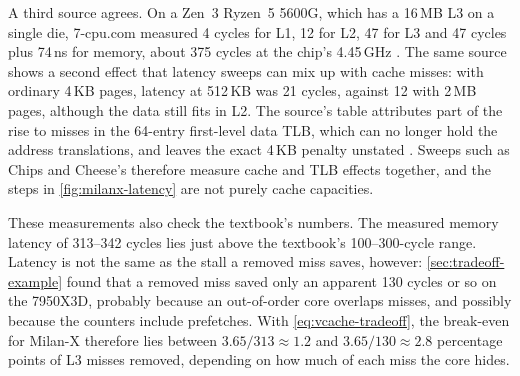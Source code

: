 A third source agrees. On a Zen~3 Ryzen~5 5600G, which has a 16\,MB L3 on a single die, 7-cpu.com measured 4 cycles for L1, 12 for L2, 47 for L3 and 47 cycles plus 74\,ns for memory, about 375 cycles at the chip's 4.45\,GHz \cite{7-cpu.comAMDZen3}. The same source shows a second effect that latency sweeps can mix up with cache misses: with ordinary 4\,KB pages, latency at 512\,KB was 21 cycles, against 12 with 2\,MB pages, although the data still fits in L2. The source's table attributes part of the rise to misses in the 64-entry first-level data TLB, which can no longer hold the address translations, and leaves the exact 4\,KB penalty unstated \cite{7-cpu.comAMDZen3}. Sweeps such as Chips and Cheese's therefore measure cache and TLB effects together, and the steps in \cref{fig:milanx-latency} are not purely cache capacities.

These measurements also check the textbook's numbers. The measured memory latency of 313--342 cycles lies just above the textbook's 100--300-cycle range. Latency is not the same as the stall a removed miss saves, however: \cref{sec:tradeoff-example} found that a removed miss saved only an apparent 130 cycles or so on the 7950X3D, probably because an out-of-order core overlaps misses, and possibly because the counters include prefetches. With \cref{eq:vcache-tradeoff}, the break-even for Milan-X therefore lies between $3.65/313 \approx 1.2$ and $3.65/130 \approx 2.8$ percentage points of L3 misses removed, depending on how much of each miss the core hides.

